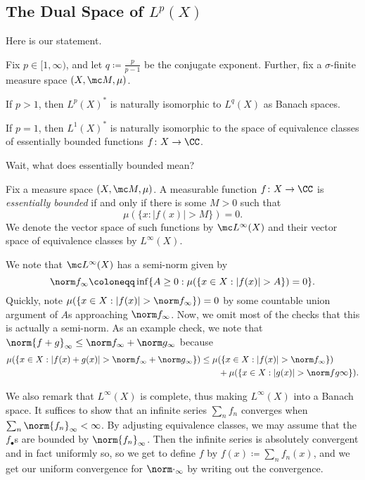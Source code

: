 \documentclass[../notes.tex]{subfiles}
\begin{document}
\subsection{The Dual Space of \texorpdfstring{$L^p(X)$}{Lp}}
Here is our statement.
\begin{theorem} \label{thm:dual-lp}
	Fix $p\in[1,\infty)$, and let $q\coloneqq\frac p{p-1}$ be the conjugate exponent. Further, fix a $\sigma$-finite measure space $(X,\mc M,\mu)$.
	\begin{listalph}
		\item If $p>1$, then $L^p(X)^*$ is naturally isomorphic to $L^q(X)$ as Banach spaces.
		\item If $p=1$, then $L^1(X)^*$ is naturally isomorphic to the space of equivalence classes of essentially bounded functions $f\colon X\to\CC$.
	\end{listalph}
\end{theorem}
Wait, what does essentially bounded mean?
\begin{definition}
	Fix a measure space $(X,\mc M,\mu)$. A measurable function $f\colon X\to\CC$ is \textit{essentially bounded} if and only if there is some $M>0$ such that
	\[\mu(\{x:\left|f(x)\right|>M\})=0.\]
	We denote the vector space of such functions by $\mc L^\infty(X)$ and their vector space of equivalence classes by $L^\infty(X)$.
\end{definition}
\begin{remark}
	We note that $\mc L^\infty(X)$ has a semi-norm given by
	\[\norm f_\infty\coloneqq\inf\{A\ge0:\mu(\{x\in X:\left|f(x)\right|>A\})=0\}.\]
	Quickly, note $\mu(\{x\in X:\left|f(x)\right|>\norm f_\infty\})=0$ by some countable union argument of $A$s approaching $\norm f_\infty$. Now, we omit most of the checks that this is actually a semi-norm. As an example check, we note that $\norm{f+g}_\infty\le\norm f_\infty+\norm g_\infty$ because
	\begin{align*}
		\mu(\{x\in X:\left|f(x)+g(x)\right|>\norm f_\infty+\norm g_\infty\})&\le\mu(\{x\in X:\left|f(x)\right|>\norm f_\infty\}) \\
		&\qquad+\mu(\{x\in X:\left|g(x)\right|>\norm fg\infty\}).
	\end{align*}
\end{remark}
\begin{remark}
	We also remark that $L^\infty(X)$ is complete, thus making $L^\infty(X)$ into a Banach space. It suffices to show that an infinite series $\sum_nf_n$ converges when $\sum_n\norm{f_n}_\infty<\infty$. By adjusting equivalence classes, we may assume that the $f_\bullet$s are bounded by $\norm{f_n}_\infty$. Then the infinite series is absolutely convergent and in fact uniformly so, so we get to define $f$ by $f(x)\coloneqq\sum_nf_n(x)$, and we get our uniform convergence for $\norm\cdot_\infty$ by writing out the convergence.
\end{remark}
\end{document}
